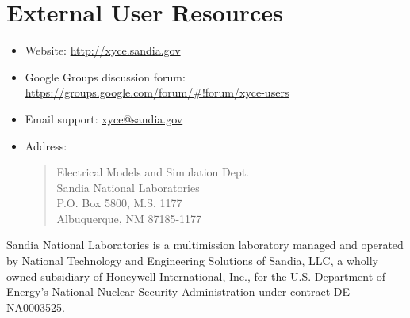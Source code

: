 \documentclass[letterpaper]{scrartcl}
\begin{document}
\section{External User Resources}
\begin{itemize}
  \item Website: {\color{XyceDeepRed}\url{http://xyce.sandia.gov}}
  \item Google Groups discussion forum:
    {\color{XyceDeepRed}\url{https://groups.google.com/forum/#!forum/xyce-users}}
  \item Email support:
    {\color{XyceDeepRed}\href{mailto:xyce@sandia.gov}{xyce@sandia.gov}}
  \item Address:
    \begin{quote}
            Electrical Models and Simulation Dept.\\
            Sandia National Laboratories\\
            P.O. Box 5800, M.S. 1177\\
            Albuquerque, NM 87185-1177 \\
    \end{quote}
\end{itemize}

\vspace*{\fill}
\noindent
Sandia National Laboratories is a multimission laboratory managed and
operated by National Technology and Engineering Solutions of Sandia,
LLC, a wholly owned subsidiary of Honeywell International, Inc., for
the U.S. Department of Energy's National Nuclear Security
Administration under contract DE-NA0003525.
\end{document}
